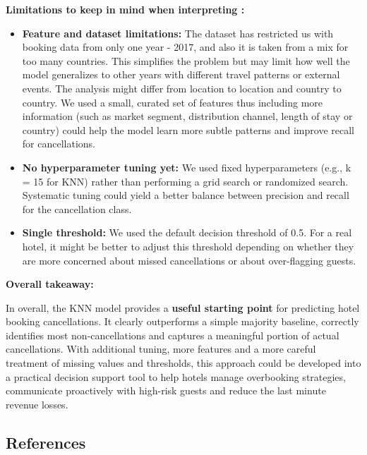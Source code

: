 \documentclass[
  letterpaper,
  DIV=11,
  numbers=noendperiod]{scrartcl}
\providecommand{\tightlist}{%
  \setlength{\itemsep}{0pt}\setlength{\parskip}{0pt}}
\begin{document}
\textbf{Limitations to keep in mind when interpreting :}

\begin{itemize}
\tightlist
\item
  \textbf{Feature and dataset limitations:} The dataset has restricted
  us with booking data from only one year - 2017, and also it is taken
  from a mix for too many countries. This simplifies the problem but may
  limit how well the model generalizes to other years with different
  travel patterns or external events. The analysis might differ from
  location to location and country to country. We used a small, curated
  set of features thus including more information (such as market
  segment, distribution channel, length of stay or country) could help
  the model learn more subtle patterns and improve recall for
  cancellations.
\item
  \textbf{No hyperparameter tuning yet:} We used fixed hyperparameters
  (e.g., k = 15 for KNN) rather than performing a grid search or
  randomized search. Systematic tuning could yield a better balance
  between precision and recall for the cancellation class.
\item
  \textbf{Single threshold:} We used the default decision threshold of
  0.5. For a real hotel, it might be better to adjust this threshold
  depending on whether they are more concerned about missed
  cancellations or about over-flagging guests.
\end{itemize}

\textbf{Overall takeaway:}

In overall, the KNN model provides a \textbf{useful starting point} for
predicting hotel booking cancellations. It clearly outperforms a simple
majority baseline, correctly identifies most non-cancellations and
captures a meaningful portion of actual cancellations. With additional
tuning, more features and a more careful treatment of missing values and
thresholds, this approach could be developed into a practical decision
support tool to help hotels manage overbooking strategies, communicate
proactively with high-risk guests and reduce the last minute revenue
losses.

\subsection*{References}\label{references}
\end{document}

